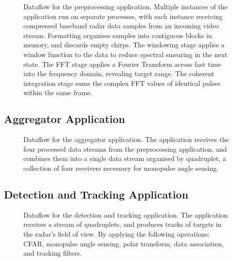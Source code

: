 \begin{figure}[htbp]
    \centering
    \caption{Dataflow for the preprocessing application. Multiple instances of the application run on separate processes, with each instance receiving compressed baseband radar data samples from an incoming video stream. Formatting organises samples into contiguous blocks in memory, and discards empty chirps. The windowing stage applies a window function to the data to reduce spectral smearing in the next state. The FFT stage applies a Fourier Transform across fast time into the frequency domain, revealing target range. The coherent integration stage sums the complex FFT values of identical pulses within the same frame. } 
    \label{fig:preprocessing-dataflow}
\end{figure}

\subsection{Aggregator Application}
\begin{figure}[htbp]
    \centering
    \caption{Dataflow for the aggregator application. The application receives the four processed data streams from the preprocessing application, and combines them into a single data stream organised by quadruplet, a collection of four receivers necessary for monopulse angle sensing.}
    \label{fig:aggregator-dataflow}
\end{figure}

\subsection{Detection and Tracking Application}
\begin{figure}[htbp]
    \centering
    \caption{Dataflow for the detection and tracking application. The application receives a stream of quadruplets, and produces tracks of targets in the radar's field of view. By applying the following operations: CFAR, monopulse angle sensing, polar transform, data association, and tracking filters.}
    \label{fig:detection-and-tracking-dataflow}
\end{figure}